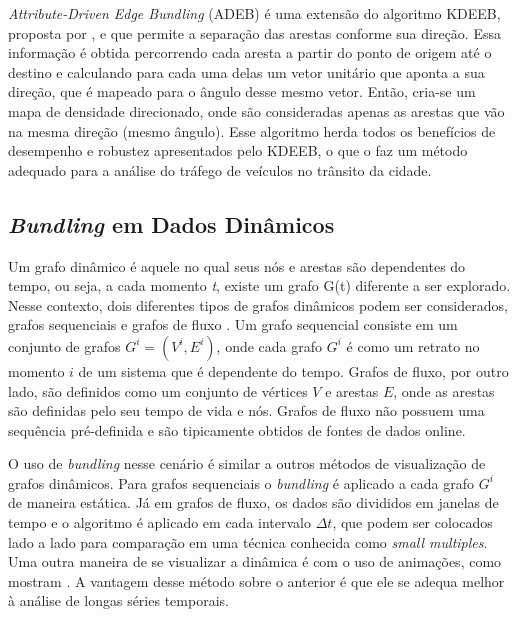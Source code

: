 
  {\emph{Attribute-Driven Edge Bundling} (ADEB) é uma extensão do algoritmo
KDEEB, proposta por \citet{ZegarraFlores2016}, e que permite a separação das
arestas conforme sua direção. Essa informação é obtida percorrendo cada aresta
a partir do ponto de origem até o destino e calculando para cada uma delas um
vetor unitário que aponta a sua direção, que é mapeado para o
ângulo desse mesmo vetor. Então, cria-se um mapa de densidade direcionado, onde são
consideradas apenas as arestas que vão na mesma direção (mesmo ângulo). Esse
algoritmo herda todos os benefícios de desempenho e robustez apresentados pelo
KDEEB, o que o faz um método adequado para a análise do tráfego de veículos no
trânsito da cidade.

\subsection{\emph{Bundling} em Dados Dinâmicos}

  Um grafo dinâmico é aquele no qual seus nós e arestas são dependentes do
tempo, ou seja, a cada momento \emph{t}, existe um grafo G(t) diferente a ser
explorado. Nesse contexto, dois diferentes tipos de grafos dinâmicos podem ser
considerados, grafos sequenciais e grafos de fluxo \citep{Hurter2013}. Um
grafo sequencial consiste em um conjunto de grafos $G^i = (V^i, E^i)$, onde
cada grafo $G^i$ é como um retrato no momento $i$ de um sistema que é
dependente do tempo. Grafos de fluxo, por outro lado, são definidos como um
conjunto de vértices $V$ e arestas $E$, onde as arestas são definidas pelo seu
tempo de vida e nós. Grafos de fluxo não possuem uma sequência pré-definida e
são tipicamente obtidos de fontes de dados online.

  O uso de \emph{bundling} nesse cenário é similar a outros métodos de
visualização de grafos dinâmicos. Para grafos sequenciais o \emph{bundling} é
aplicado a cada grafo $G^i$ de maneira estática. Já em grafos de fluxo, os
dados são divididos em janelas de tempo e o algoritmo é aplicado em cada
intervalo $\Delta t$, que podem ser colocados lado a lado para comparação em
uma técnica conhecida como \emph{small multiples}. Uma outra maneira de se
visualizar a dinâmica é com o uso de animações, como mostram
\citet{Hurter2014}. A vantagem desse método sobre o anterior é que ele se
adequa melhor à análise de longas séries temporais.

}

